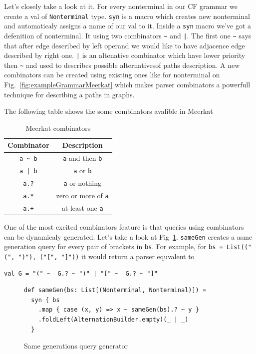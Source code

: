 Let's closely take a look at it. For every nonterminal in our CF grammar we create a val of  \lstinline{Nonterminal} type. \lstinline{syn} is a macro which creates new nonterminal and automaticaly assigns a name of our val to it. Inside a \lstinline{syn} macro we've got a defenition of nonterminal. It using two combinators \lstinline{~} and \lstinline{|}. The first one \lstinline{~} says that after edge described by left operand we would like to have adjacence edge described by right one. \lstinline{|} is an altenative combinator which have lower priority then \lstinline{~} and used to describes possible alternativesof paths description. A new combinators can be created using existing ones like for nonterminal on Fig.~\ref{fig:exampleGrammarMeerkat} which makes parser combinators a powerfull technique for describing a paths in graphs.

The following table shows the some combinators avalible in Meerkat 

\begin{table}[h]
\centering
\begin{tabular}{|c|c|}
\hline
\multicolumn{1}{|c|}{Combinator} & \multicolumn{1}{c|}{Description} \\ \hline
{\lstinline!a ~ b!} & {\lstinline!a!} and then {\lstinline!b!}   \\
{\lstinline!a | b!} & {\lstinline!a!} or {\lstinline!b!}         \\
{\lstinline!a.?!}   & {\lstinline!a!} or nothing   \\
{\lstinline!a.*!}   & zero or more of {\lstinline!a!} \\
{\lstinline!a.+!}   & at least one {\lstinline!a!} \\
\hline
\end{tabular}
\caption{Meerkat combinators}
\label{table:combinators}
\end{table}

One of the most excited combinators feature is that queries using combinators can be dynamicaly generated. Let's take a look at Fig~\ref{fig:gen}. \lstinline{sameGen} creates a asme generation query for every pair of brackets in \lstinline{bs}. For example, for \lstinline{bs = List(("(", ")"), ("[", "]"))} it would return a parser equvalent to 
\begin{lstlisting}
val G = "(" ~  G.? ~ ")" | "[" ~  G.? ~ "]"
\end{lstlisting}
\begin{figure}[h]
\begin{lstlisting}
def sameGen(bs: List[(Nonterminal, Nonterminal)]) = 
  syn { bs
    .map { case (x, y) => x ~ sameGen(bs).? ~ y }
    .foldLeft(AlternationBuilder.empty)(_ | _)
  }
\end{lstlisting}
\caption{Same generations query generator}
\label{fig:gen}
\end{figure}

